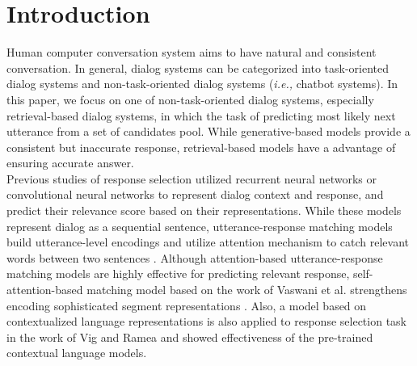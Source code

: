 \documentclass[a4paper]{article}
\begin{document}
 \section{Introduction}
Human computer conversation system aims to have natural and consistent conversation. In general, dialog systems can be categorized into task-oriented dialog systems and non-task-oriented dialog systems ({\em{i.e.,}} chatbot systems). In this paper, we focus on one of non-task-oriented dialog systems, especially retrieval-based dialog systems, in which the task of predicting most likely next utterance from a set of candidates pool. While generative-based models provide a consistent but inaccurate response, retrieval-based models have a advantage of ensuring accurate answer.\\
\indent Previous studies of response selection utilized recurrent neural networks \cite{lowe2015ubuntu} or convolutional neural networks \cite{kadlec2015improved} to represent dialog context and response, and predict their relevance score based on their representations. While these models represent dialog as a sequential sentence, utterance-response matching models build utterance-level encodings and utilize attention mechanism to catch relevant words between two sentences \cite{wu2017sequential,zhang2018dua}. Although attention-based utterance-response matching models are highly effective for predicting relevant response, self-attention-based matching model based on the work of Vaswani et al. \cite{vaswani2017attention} strengthens encoding sophisticated segment representations \cite{zhou2018multi,tao2019one,yuan2019multi}. Also, a model based on contextualized language representations is also applied to response selection task in the work of Vig and Ramea \cite{vig2019comparison} and showed effectiveness of the pre-trained contextual language models. \\
\end{document}
